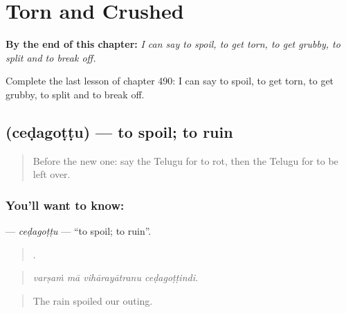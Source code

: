 
\chapter{Torn and Crushed}
\label{ch:te-torn-and-crushed}

\begin{chapteropening}
\textbf{By the end of this chapter:} \emph{I can say to spoil, to get torn, to get grubby, to split and to break off.}

Complete the last lesson of chapter 490: I can say to spoil, to get torn, to get grubby, to split and to break off.
\end{chapteropening}

\section[\texorpdfstring{\te{చెడగొట్టు} (ceḍagoṭṭu)}{చెడగొట్టు (ceḍagoṭṭu)}]{ (ceḍagoṭṭu) — to spoil; to ruin}

\label{lesson:TE-C490-cedagottu}



\begin{quote}
Before the new one: say the Telugu for to rot, then the Telugu for to be left over.
\end{quote}

\subsection*{You'll want to know: }
\textbf{} — \emph{ceḍagoṭṭu} — \textquotedblleft{}to spoil; to ruin\textquotedblright{}.

\begin{quote}
   .
\end{quote}

\begin{quote}
\emph{varṣaṁ mā vihārayātranu ceḍagoṭṭindi.}
\end{quote}

\begin{quote}
The rain spoiled our outing.
\end{quote}


